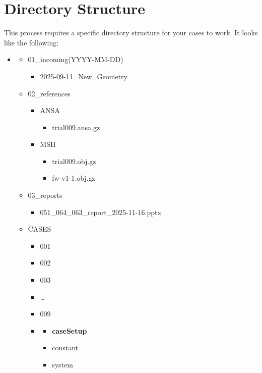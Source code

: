 \section{Directory Structure}
This process requires a specific directory structure for your cases to work. It looks like the following:
\begin{itemize}
    \item {}
    \begin{itemize}
        \item 01\_incoming(YYYY-MM-DD)
        \begin{itemize}
            \item 2025-09-11\_New\_Geometry
        \end{itemize}
        \item 02\_references
        \begin{itemize}
            \item ANSA
            \begin{itemize}
                \item trial009.ansa.gz
            \end{itemize}
            \item MSH
            \begin{itemize}
                \item trial009.obj.gz
                \item fw-v1-1.obj.gz
            \end{itemize}
        \end{itemize}
        \item 03\_reports
        \begin{itemize}
            \item 051\_064\_063\_report\_2025-11-16.pptx
        \end{itemize}
        \item CASES
        \begin{itemize}
            \item 001
            \item 002
            \item 003
            \item \dots
            \item 009
            \item \begin{itemize}
                \item \textbf{caseSetup}
                \item constant
                \item system
            \end{itemize}
        \end{itemize}
    \end{itemize}
\end{itemize}

